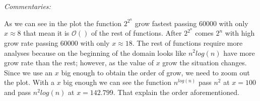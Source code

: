 \documentclass[12pt]{article}
\begin{document}
\emph{Commentaries: }

As we can see in the plot the function $2^{2^{n}}$ grow fastest passing 60000 with only $x \approx 8$ that mean it is $\mathcal{O}()$ of the rest of functions. After $2^{2^{n}}$ comes $2^{n}$ with high grow rate passing 60000 with only $x \approx 18$. The rest of functions require more analyses because on the beginning of the domain looks like $n^{2}log(n)$ have more grow rate than the rest; however, as the value of $x$ grow the situation changes. Since we use an $x$ big enough to obtain the order of grow, we need to zoom out the plot. With a $x$ big enough we can see the function $n^{log(n)}$ pass $n^{2}$ at $x = 100$ and pass $n^{2}log(n)$ at $x = 142.799$. That explain the order aforementioned.
\end{document}
